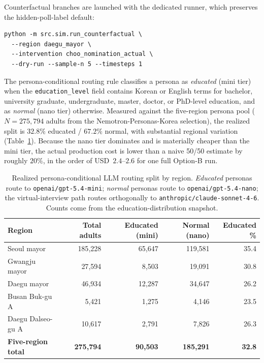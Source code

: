 \documentclass[11pt]{article}
\begin{document}
Counterfactual branches are launched with the dedicated runner, which preserves the hidden-poll-label default:
\begin{verbatim}
python -m src.sim.run_counterfactual \
  --region daegu_mayor \
  --intervention choo_nomination_actual \
  --dry-run --sample-n 5 --timesteps 1
\end{verbatim}

The persona-conditional routing rule classifies a persona as \emph{educated} (mini tier) when the \texttt{education\_level} field contains Korean or English terms for bachelor, university graduate, undergraduate, master, doctor, or PhD-level education, and as \emph{normal} (nano tier) otherwise. Measured against the five-region persona pool ($N{=}275{,}794$ adults from the Nemotron-Personas-Korea selection), the realized split is $32.8\%$ educated / $67.2\%$ normal, with substantial regional variation (Table~\ref{tab:routing-split}). Because the nano tier dominates and is materially cheaper than the mini tier, the actual production cost is lower than a naive 50/50 estimate by roughly $20\%$, in the order of USD~$2.4$--$2.6$ for one full Option-B run.

\begin{table}[h]
\centering
\caption{Realized persona-conditional LLM routing split by region. \emph{Educated} personas route to \texttt{openai/gpt-5.4-mini}; \emph{normal} personas route to \texttt{openai/gpt-5.4-nano}; the virtual-interview path routes orthogonally to \texttt{anthropic/claude-sonnet-4-6}. Counts come from the education-distribution snapshot.}
\label{tab:routing-split}
\small
\setlength{\tabcolsep}{6pt}
\begin{tabular}{l r r r r}
\toprule
Region & Total adults & Educated (mini) & Normal (nano) & Educated \% \\
\midrule
Seoul mayor             & 185{,}228 & 65{,}647 & 119{,}581 & 35.4 \\
Gwangju mayor           &  27{,}594 &  8{,}503 &  19{,}091 & 30.8 \\
Daegu mayor             &  46{,}934 & 12{,}287 &  34{,}647 & 26.2 \\
Busan Buk-gu A          &   5{,}421 &  1{,}275 &   4{,}146 & 23.5 \\
Daegu Dalseo-gu A       &  10{,}617 &  2{,}791 &   7{,}826 & 26.3 \\
\midrule
\textbf{Five-region total} & \textbf{275{,}794} & \textbf{90{,}503} & \textbf{185{,}291} & \textbf{32.8} \\
\bottomrule
\end{tabular}
\end{table}
\end{document}
